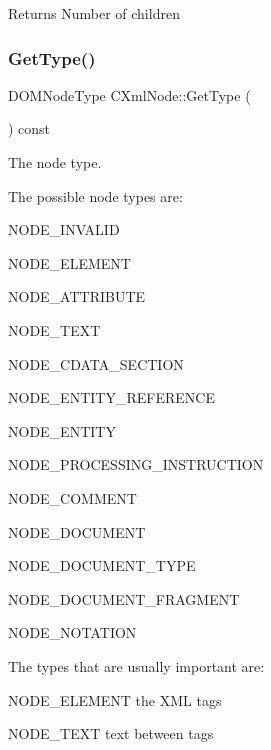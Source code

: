 \begin{DoxyReturn}{Returns}
Number of children 
\end{DoxyReturn}
\mbox{\label{classxmlnode_1_1_c_xml_node_ac6a20070f4679d4b7e4e69b844692214}} 
\subsubsection{\texorpdfstring{GetType()}{GetType()}}
{\footnotesize\ttfamily D\+O\+M\+Node\+Type C\+Xml\+Node\+::\+Get\+Type (\begin{DoxyParamCaption}{ }\end{DoxyParamCaption}) const}



The node type. 

The possible node types are\+:
\begin{DoxyItemize}
\item N\+O\+D\+E\+\_\+\+I\+N\+V\+A\+L\+ID
\item N\+O\+D\+E\+\_\+\+E\+L\+E\+M\+E\+NT
\item N\+O\+D\+E\+\_\+\+A\+T\+T\+R\+I\+B\+U\+TE
\item N\+O\+D\+E\+\_\+\+T\+E\+XT
\item N\+O\+D\+E\+\_\+\+C\+D\+A\+T\+A\+\_\+\+S\+E\+C\+T\+I\+ON
\item N\+O\+D\+E\+\_\+\+E\+N\+T\+I\+T\+Y\+\_\+\+R\+E\+F\+E\+R\+E\+N\+CE
\item N\+O\+D\+E\+\_\+\+E\+N\+T\+I\+TY
\item N\+O\+D\+E\+\_\+\+P\+R\+O\+C\+E\+S\+S\+I\+N\+G\+\_\+\+I\+N\+S\+T\+R\+U\+C\+T\+I\+ON
\item N\+O\+D\+E\+\_\+\+C\+O\+M\+M\+E\+NT
\item N\+O\+D\+E\+\_\+\+D\+O\+C\+U\+M\+E\+NT
\item N\+O\+D\+E\+\_\+\+D\+O\+C\+U\+M\+E\+N\+T\+\_\+\+T\+Y\+PE
\item N\+O\+D\+E\+\_\+\+D\+O\+C\+U\+M\+E\+N\+T\+\_\+\+F\+R\+A\+G\+M\+E\+NT
\item N\+O\+D\+E\+\_\+\+N\+O\+T\+A\+T\+I\+ON
\end{DoxyItemize}

The types that are usually important are\+:
\begin{DoxyItemize}
\item N\+O\+D\+E\+\_\+\+E\+L\+E\+M\+E\+NT the X\+ML tags
\item N\+O\+D\+E\+\_\+\+T\+E\+XT text between tags
\end{DoxyItemize}

